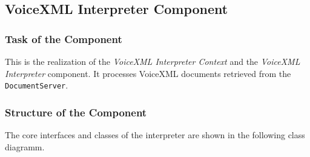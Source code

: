 \documentclass[11pt,a4paper]{article}
\begin{document}
\subsection{VoiceXML Interpreter Component}
\label{sec:voic-interpr-comp}

\subsubsection{Task of the Component}

This is the realization of the 
\emph{VoiceXML Interpreter Context} and the \emph{VoiceXML Interpreter}
component. It processes VoiceXML documents retrieved from the
\texttt{DocumentServer}.

\subsubsection{Structure of the Component}

The core interfaces and classes of the interpreter are shown in the following
class diagramm.
\end{document}
